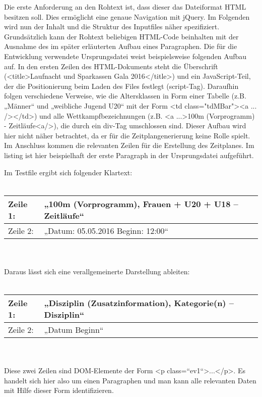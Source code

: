 {Die erste Anforderung an den Rohtext ist, dass dieser das Dateiformat HTML besitzen soll. Dies ermöglicht eine genaue Navigation mit jQuery. Im Folgenden wird nun der Inhalt und die Struktur des Inputfiles näher spezifiziert. Grundsätzlich kann der Rohtext beliebigen HTML-Code beinhalten mit der Ausnahme des im später erläuterten Aufbau eines Paragraphen. 
Die für die Entwicklung verwendete Ursprungsdatei weist beispielsweise folgenden Aufbau auf. In den ersten Zeilen des HTML-Dokuments steht die Überschrift (<title>Laufnacht und Sparkassen Gala 2016</title>) und ein JavaScript-Teil, der die Positionierung beim Laden des Files festlegt (script-Tag). Daraufhin folgen verschiedene Verweise, wie die Altersklassen in Form einer Tabelle (z.B. „Männer“ und „weibliche Jugend U20“ mit der Form <td class="tdMBar"><a ... /></td>) und alle Wettkampfbezeichnungen (z.B. <a ...>100m (Vorprogramm) - Zeitläufe<a/>), die durch ein div-Tag umschlossen sind. Dieser Aufbau wird hier nicht näher betrachtet, da er für die Zeitplangenerierung keine Rolle spielt.\\
Im Anschluss kommen die relevanten Zeilen für die Erstellung des Zeitplanes. Im listing ist hier beispielhaft der erste Paragraph in der Ursprungsdatei aufgeführt.\\
\lstset{language=html}

Im Testfile ergibt sich folgender Klartext:\\
\\
\begin{tabular}{|l||l|}
\hline
Zeile 1: & „100m (Vorprogramm), Frauen + U20 + U18 – Zeitläufe“ \\
\hline
Zeile 2: & „Datum: 05.05.2016 Beginn: 12:00“ \\
\hline
\end{tabular} \\
\\
Daraus lässt sich eine verallgemeinerte Darstellung ableiten:\\
\\
\begin{tabular}{|l||l|}
\hline
Zeile 1: & „Disziplin (Zusatzinformation), Kategorie(n) – Disziplin“ \\
\hline
Zeile 2: & „Datum Beginn“ \\
\hline
\end{tabular} \\
\\
Diese zwei Zeilen sind DOM-Elemente der Form <p class=“ev1“>...</p>. Es handelt sich hier also um einen Paragraphen und man kann alle relevanten Daten mit Hilfe dieser Form identifizieren.
}
